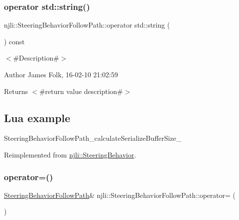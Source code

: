 \subsubsection{\texorpdfstring{operator std\+::string()}{operator std::string()}}
{\footnotesize\ttfamily njli\+::\+Steering\+Behavior\+Follow\+Path\+::operator std\+::string (\begin{DoxyParamCaption}{ }\end{DoxyParamCaption}) const\hspace{0.3cm}{\ttfamily [virtual]}}



$<$\#\+Description\#$>$ 

\begin{DoxyAuthor}{Author}
James Folk, 16-\/02-\/10 21\+:02\+:59
\end{DoxyAuthor}
\begin{DoxyReturn}{Returns}
$<$\#return value description\#$>$
\end{DoxyReturn}
\hypertarget{classnjli_1_1_steering_behavior_wander_ex1}{}\subsection{Lua example}\label{classnjli_1_1_steering_behavior_wander_ex1}

\begin{DoxyCodeInclude}
\end{DoxyCodeInclude}
Steering\+Behavior\+Follow\+Path\+\_\+calculate\+Serialize\+Buffer\+Size\+\_\+ 

Reimplemented from \mbox{\hyperlink{classnjli_1_1_steering_behavior_acd7af46e42a8a3fc1208a47f50836ac8}{njli\+::\+Steering\+Behavior}}.

\mbox{\label{classnjli_1_1_steering_behavior_follow_path_aeecda49cfcc232396ee803739ebbe1c2}} 
\subsubsection{\texorpdfstring{operator=()}{operator=()}}
{\footnotesize\ttfamily \mbox{\hyperlink{classnjli_1_1_steering_behavior_follow_path}{Steering\+Behavior\+Follow\+Path}}\& njli\+::\+Steering\+Behavior\+Follow\+Path\+::operator= (\begin{DoxyParamCaption}\item[{const \mbox{\hyperlink{classnjli_1_1_steering_behavior_follow_path}{Steering\+Behavior\+Follow\+Path}} \&}]{ }\end{DoxyParamCaption})\hspace{0.3cm}{\ttfamily [protected]}}

